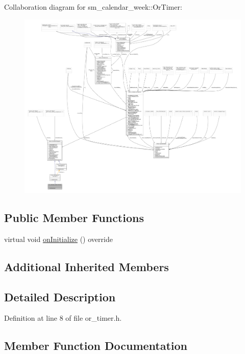 Collaboration diagram for sm\+\_\+calendar\+\_\+week\+:\+:Or\+Timer\+:
\nopagebreak
\begin{figure}[H]
\begin{center}
\leavevmode
\includegraphics[width=350pt]{classsm__calendar__week_1_1OrTimer__coll__graph}
\end{center}
\end{figure}
\subsection*{Public Member Functions}
\begin{DoxyCompactItemize}
\item 
virtual void \hyperlink{classsm__calendar__week_1_1OrTimer_a11daa3f172f896e3956cd4747aab5ab8}{on\+Initialize} () override
\end{DoxyCompactItemize}
\subsection*{Additional Inherited Members}


\subsection{Detailed Description}


Definition at line 8 of file or\+\_\+timer.\+h.



\subsection{Member Function Documentation}
\mbox{\label{classsm__calendar__week_1_1OrTimer_a11daa3f172f896e3956cd4747aab5ab8}} 
